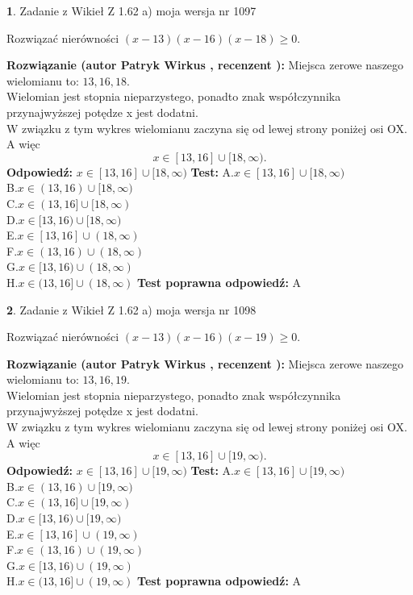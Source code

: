 \documentclass[12pt, a4paper]{article}
\theoremstyle{definition} %
\newtheorem{zad}{}
\newcommand{\zadStart}[1]{\begin{zad}#1\newline}
\newcommand{\zadStop}{\end{zad}}
\newcommand{\rozwStart}[2]{\noindent \textbf{Rozwiązanie (autor #1 , recenzent #2): }\newline}
\newcommand{\rozwStop}{\newline}
\newcommand{\odpStart}{\noindent \textbf{Odpowiedź:}\newline}
\newcommand{\odpStop}{\newline}
\newcommand{\testStart}{\noindent \textbf{Test:}\newline}
\newcommand{\testStop}{\newline}
\newcommand{\kluczStart}{\noindent \textbf{Test poprawna odpowiedź:}\newline}
\newcommand{\kluczStop}{\newline}
\begin{document}
\zadStart{Zadanie z Wikieł Z 1.62 a) moja wersja nr 1097}

Rozwiązać nierówności $(x-13)(x-16)(x-18)\ge0$.
\zadStop
\rozwStart{Patryk Wirkus}{}
Miejsca zerowe naszego wielomianu to: $13, 16, 18$.\\
Wielomian jest stopnia nieparzystego, ponadto znak współczynnika przy\linebreak najwyższej potędze x jest dodatni.\\ W związku z tym wykres wielomianu zaczyna się od lewej strony poniżej osi OX. A więc $$x \in [13,16] \cup [18,\infty).$$
\rozwStop
\odpStart
$x \in [13,16] \cup [18,\infty)$
\odpStop
\testStart
A.$x \in [13,16] \cup [18,\infty)$\\
B.$x \in (13,16) \cup [18,\infty)$\\
C.$x \in (13,16] \cup [18,\infty)$\\
D.$x \in [13,16) \cup [18,\infty)$\\
E.$x \in [13,16] \cup (18,\infty)$\\
F.$x \in (13,16) \cup (18,\infty)$\\
G.$x \in [13,16) \cup (18,\infty)$\\
H.$x \in (13,16] \cup (18,\infty)$
\testStop
\kluczStart
A
\kluczStop



\zadStart{Zadanie z Wikieł Z 1.62 a) moja wersja nr 1098}

Rozwiązać nierówności $(x-13)(x-16)(x-19)\ge0$.
\zadStop
\rozwStart{Patryk Wirkus}{}
Miejsca zerowe naszego wielomianu to: $13, 16, 19$.\\
Wielomian jest stopnia nieparzystego, ponadto znak współczynnika przy\linebreak najwyższej potędze x jest dodatni.\\ W związku z tym wykres wielomianu zaczyna się od lewej strony poniżej osi OX. A więc $$x \in [13,16] \cup [19,\infty).$$
\rozwStop
\odpStart
$x \in [13,16] \cup [19,\infty)$
\odpStop
\testStart
A.$x \in [13,16] \cup [19,\infty)$\\
B.$x \in (13,16) \cup [19,\infty)$\\
C.$x \in (13,16] \cup [19,\infty)$\\
D.$x \in [13,16) \cup [19,\infty)$\\
E.$x \in [13,16] \cup (19,\infty)$\\
F.$x \in (13,16) \cup (19,\infty)$\\
G.$x \in [13,16) \cup (19,\infty)$\\
H.$x \in (13,16] \cup (19,\infty)$
\testStop
\kluczStart
A
\kluczStop
\end{document}
